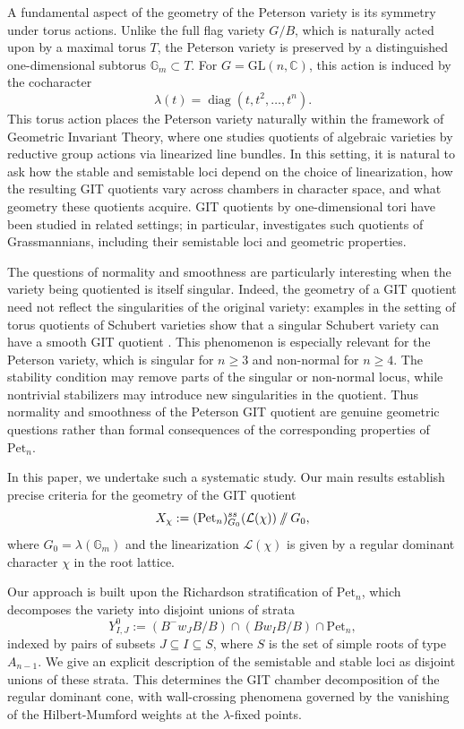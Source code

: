 \documentclass[12pt, reqno]{amsart}
\newcommand{\sslash}{\mathbin{/\mkern-6mu/}}
\theoremstyle{plain}
\numberwithin{equation}{section}
\theoremstyle{definition}
\begin{document}
A fundamental aspect of the geometry of the Peterson variety is its symmetry under torus actions. Unlike the full flag variety $G/B$, which is naturally acted upon by a maximal torus $T$, the Peterson variety is preserved by a distinguished one-dimensional subtorus $ \mathbb{G}_m \subset T$. For $G=\mathrm{GL}(n,\mathbb{C})$, this action is induced by the cocharacter
\[
\lambda(t)=\operatorname{diag}(t,t^2,\ldots,t^n).
\]
This torus action places the Peterson variety naturally within the framework of Geometric Invariant Theory, where one studies quotients of algebraic varieties by reductive group actions via linearized line bundles. In this setting, it is natural to ask how the stable and semistable loci depend on the choice of linearization, how the resulting GIT quotients vary across chambers in character space, and what geometry these quotients acquire. GIT quotients by one-dimensional tori have been studied in related
settings; in particular, \cite{BKP} investigates such quotients of
Grassmannians, including their semistable loci and geometric
properties.

The questions of normality and smoothness are particularly interesting
when the variety being quotiented is itself singular. Indeed, the
geometry of a GIT quotient need not reflect the singularities of the
original variety: examples in the setting of torus quotients of
Schubert varieties show that a singular Schubert variety can have a
smooth GIT quotient \cite{BP}. This phenomenon is especially relevant
for the Peterson variety, which is singular for \(n\ge3\) and
non-normal for \(n\ge4\). The stability condition may remove parts of
the singular or non-normal locus, while nontrivial stabilizers may
introduce new singularities in the quotient. Thus normality and
smoothness of the Peterson GIT quotient are genuine geometric
questions rather than formal consequences of the corresponding
properties of \(\mathrm{Pet}_n\).

In this paper, we undertake such a systematic study. Our main results establish precise criteria for the geometry of the GIT quotient
\[
X_\chi:= (\mathrm{Pet}_n)^{ss}_{G_0}(\mathcal L(\chi))
\sslash G_0,
\] where $G_0=\lambda(\mathbb G_m)$ and the linearization \(\mathcal L(\chi)\) is given by a 
regular dominant character \(\chi\) in the root lattice.

Our approach is built upon the Richardson stratification of \(\mathrm{Pet}_n\), which decomposes the variety into disjoint unions of strata
\[
Y^0_{I,J} := (B^-w_{J}B/B) \cap (Bw_{I}B/B) \cap \mathrm{Pet}_n,
\]
indexed by pairs of subsets \(J \subseteq I \subseteq S\), where \(S\) is the set of simple roots of type \(A_{n-1}\). We give an explicit description of the semistable and stable loci as disjoint unions of these strata. This determines the GIT chamber decomposition of the regular dominant cone, with wall-crossing phenomena governed by the vanishing of the Hilbert-Mumford weights at the \(\lambda\)-fixed points.
\end{document}
